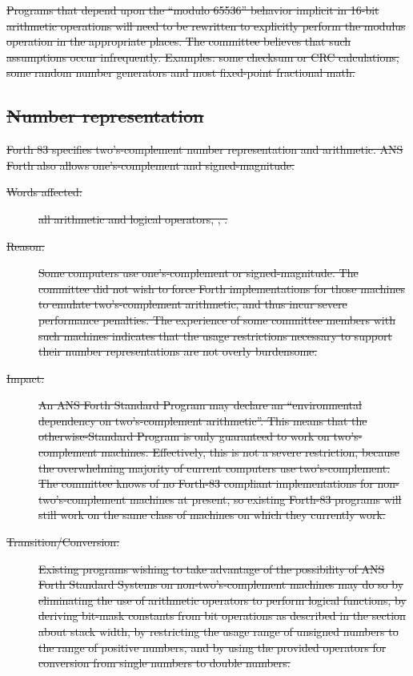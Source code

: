 \sout{%
Programs that depend upon the ``modulo 65536'' behavior implicit in
16-bit arithmetic operations will need to be rewritten to explicitly
perform the modulus operation in the appropriate places. The committee
believes that such assumptions occur infrequently. Examples: some
checksum or CRC calculations, some random number generators and most
fixed-point fractional math.}

\subsection[Number representation]{\sout{Number representation}} %

\sout{%
Forth 83 specifies two's-complement number representation and
arithmetic. ANS Forth also allows one's-complement and
signed-magnitude.}

\begin{description}
\item[\sout{Words affected:}]
\sout{%
	all arithmetic and logical operators,
	,
	.}

\item[\sout{Reason:}]
\sout{%
	Some computers use one's-complement or signed-magnitude. The
	committee did not wish to force Forth implementations for those
	machines to emulate two's-complement arithmetic, and thus incur
	severe performance penalties. The experience of some committee
	members with such machines indicates that the usage restrictions
	necessary to support their number representations are not overly
	burdensome.}

\item[\sout{Impact:}]
\sout{%
	An ANS Forth Standard Program may declare an ``environmental
	dependency on two's-com\-ple\-ment arithmetic''. This means that the
	otherwise-Standard Program is only guaranteed to work on
	two's-complement machines. Effectively, this is not a severe
	restriction, because the overwhelming majority of current
	computers use two's-complement. The committee knows of no Forth-83
	com\-pli\-ant implementations for non-two's-complement machines at
	present, so existing Forth-83 programs will still work on the same
	class of machines on which they currently work.}

\item[\sout{Transition/Conversion:}]
\sout{%
	Existing programs wishing to take advantage of the possibility of
	ANS Forth Standard Systems on non-two's-complement machines may
	do so by eliminating the use of a\-rith\-me\-tic operators to perform
	logical functions, by deriving bit-mask constants from bit
	operations as described in the section about stack width, by
	restricting the usage range of unsigned numbers to the range of
	positive numbers, and by using the provided operators for
	conversion from single numbers to double numbers.}
\end{description}

